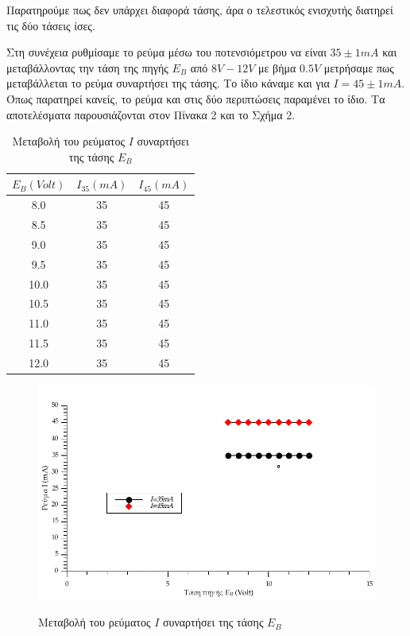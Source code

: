 \documentclass[a4paper,12pt,titlepage]{article}
\makeatletter
\def\maxwidth{
\ifdim\Gin@nat@width>\linewidth
\linewidth
\else
\Gin@nat@width
\fi
}
\makeatother
\begin{document}
Παρατηρούμε πως δεν υπάρχει διαφορά τάσης, άρα ο τελεστικός ενισχυτής διατηρεί τις δύο τάσεις ίσες.

\newpage

Στη συνέχεια ρυθμίσαμε το ρεύμα μέσω του ποτενσιόμετρου να είναι $35\pm{1}mA$ και μεταβάλλοντας την τάση της πηγής $E_{B}$ από $8V-12V$ με βήμα $0.5V$ μετρήσαμε πως μεταβάλλεται το ρεύμα συναρτήσει της τάσης. Το ίδιο κάναμε και για $I=45\pm{1}mA$. Όπως παρατηρεί κανείς, το ρεύμα και στις δύο περιπτώσεις παραμένει το ίδιο. Τα αποτελέσματα παρουσιάζονται στον Πίνακα 2 και το Σχήμα 2.

\begin{table}[h!]
\begin{center}
    \begin{tabular}{ | c | c | c |}
    \hline
     $E_{B}(Volt)$ & $I_{35} (mA)$ & $I_{45} (mA)$\\ \hline
     8.0  & 35	& 45 \\ \hline
     8.5  & 35	& 45 \\ \hline
     9.0  & 35	& 45 \\ \hline
     9.5  & 35	& 45 \\ \hline
     10.0 & 35	& 45 \\ \hline
     10.5 & 35	& 45 \\ \hline
     11.0 & 35	& 45 \\ \hline
     11.5 & 35	& 45 \\ \hline
     12.0 & 35	& 45 \\ \hline
    \end{tabular}
\end{center}
\caption{Μεταβολή του ρεύματος $I$ συναρτήσει της τάσης $E_{B}$}
\end{table}

\begin{figure}[!h]
\centering
\includegraphics[width=\maxwidth]{graph1.pdf}\\[0.3cm]
\caption{Μεταβολή του ρεύματος $I$ συναρτήσει της τάσης $E_{B}$}
\end{figure}
\end{document}
